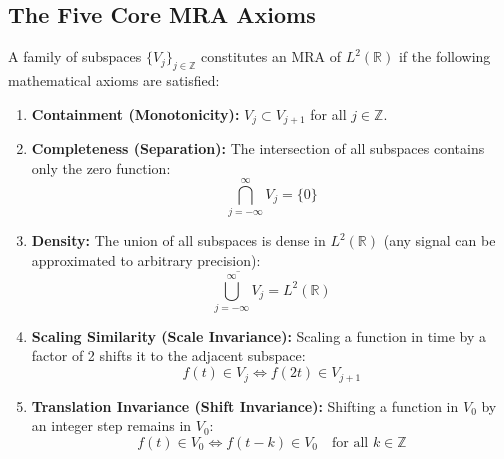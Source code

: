 \documentclass[12pt,a4paper]{article}
\begin{document}
\subsection{The Five Core MRA Axioms}
A family of subspaces $\{V_j\}_{j\in\mathbb{Z}}$ constitutes an MRA of $L^2(\mathbb{R})$ if the following mathematical axioms are satisfied:
\begin{enumerate}[leftmargin=*, itemsep=4pt]
  \item \textbf{Containment (Monotonicity):} $V_j \subset V_{j+1}$ for all $j \in \mathbb{Z}$.
  \item \textbf{Completeness (Separation):} The intersection of all subspaces contains only the zero function:
$$\bigcap_{j=-\infty}^{\infty} V_j = \{0\}$$
  \item \textbf{Density:} The union of all subspaces is dense in $L^2(\mathbb{R})$ (any signal can be approximated to arbitrary precision):
$$\overline{\bigcup_{j=-\infty}^{\infty} V_j} = L^2(\mathbb{R})$$
  \item \textbf{Scaling Similarity (Scale Invariance):} Scaling a function in time by a factor of 2 shifts it to the adjacent subspace:
$$f(t) \in V_j \iff f(2t) \in V_{j+1}$$
  \item \textbf{Translation Invariance (Shift Invariance):} Shifting a function in $V_0$ by an integer step remains in $V_0$:
$$f(t) \in V_0 \iff f(t-k) \in V_0 \quad \text{for all } k \in \mathbb{Z}$$
\end{enumerate}

\newpage
\begin{tcolorbox}[tikzbox, title={Nested Vector Subspaces Hierarchy}]
\centering
{}
\end{tcolorbox}
\end{document}
